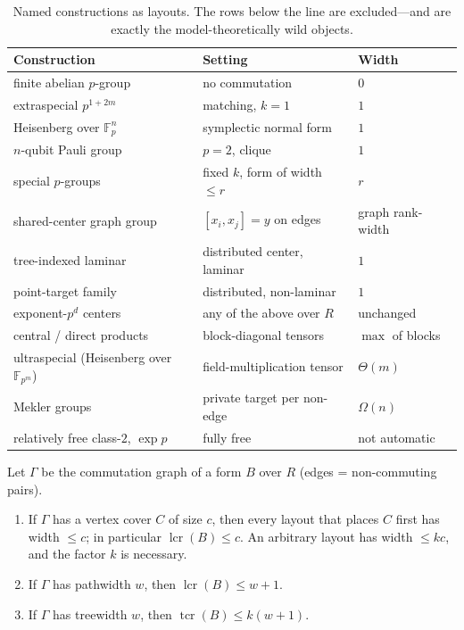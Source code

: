 \documentclass[a4paper,UKenglish,autoref,anonymous]{lipics-v2021}
\newcommand{\Fp}{\mathbb{F}_p}
\newcommand{\R}{R}                                   %
\newcommand{\lcr}{\operatorname{lcr}}
\newcommand{\tcr}{\operatorname{tcr}}
\begin{document}
\begin{table}[t]
\centering\small
\renewcommand{\arraystretch}{1.15}
\begin{tabular}{@{}p{4.4cm}p{5.6cm}p{3.2cm}@{}}
\toprule
Construction & Setting & Width \\
\midrule
finite abelian $p$-group & no commutation & $0$ \\
extraspecial $p^{1+2m}$ & matching, $k = 1$ & $1$ \\
Heisenberg over $\Fp^{n}$ & symplectic normal form & $1$ \\
$n$-qubit Pauli group & $p = 2$, clique & $1$ \\
special $p$-groups & fixed $k$, form of width $\le r$ & $r$ \\
shared-center graph group & $[x_i, x_j] = y$ on edges & graph rank-width \\
tree-indexed laminar & distributed center, laminar & $1$ \\
point-target family & distributed, non-laminar & $1$ \\
exponent-$p^d$ centers & any of the above over $\R$ & unchanged \\
central / direct products & block-diagonal tensors & $\max$ of blocks \\
\midrule
ultraspecial (Heisenberg over $\mathbb{F}_{p^m}$) & field-multiplication
tensor & $\Theta(m)$ \\
Mekler groups & private target per non-edge & $\Omega(n)$ \\
relatively free class-$2$, $\exp p$ & fully free & not
automatic~\cite{NiesStephan2023} \\
\bottomrule
\end{tabular}
\caption{Named constructions as layouts. The rows below the line are
excluded---and are exactly the model-theoretically wild objects.}
\label{tab:constructions}
\end{table}

\begin{proposition}
\label{prop:widths}
Let $\Gamma$ be the commutation graph of a form $B$ over $\R$ (edges =
non-commuting pairs).
\begin{enumerate}
\item If $\Gamma$ has a vertex cover $C$ of size $c$, then every layout
  that places $C$ first has width $\le c$; in particular $\lcr(B) \le
  c$. An arbitrary layout has width $\le kc$, and the factor $k$ is
  necessary.
\item If $\Gamma$ has pathwidth $w$, then $\lcr(B) \le w + 1$.
\item If $\Gamma$ has treewidth $w$, then $\tcr(B) \le k(w+1)$.
\end{enumerate}
\end{proposition}
\end{document}
